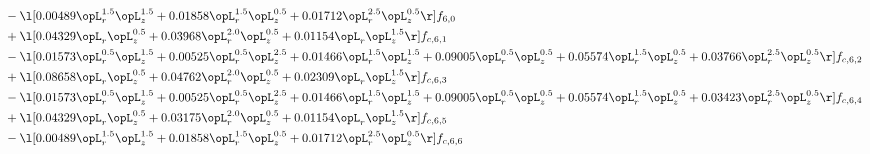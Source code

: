 \begin{alignat}{2}
& - \l[  0.00489 \opL_r^{1.5} \opL_z^{1.5} +  0.01858 \opL_r^{1.5} \opL_z^{0.5} +  0.01712 \opL_r^{2.5} \opL_z^{0.5}  \r] f_{6,0} \nonumber \\ 
& + \l[  0.04329 \opL_r \opL_z^{0.5} +  0.03968 \opL_r^{2.0} \opL_z^{0.5} +  0.01154 \opL_r \opL_z^{1.5}  \r] f_{c,6,1} \nonumber \\ 
& - \l[  0.01573 \opL_r^{0.5} \opL_z^{1.5} +  0.00525 \opL_r^{0.5} \opL_z^{2.5} +  0.01466 \opL_r^{1.5} \opL_z^{1.5} +  0.09005 \opL_r^{0.5} \opL_z^{0.5} +  0.05574 \opL_r^{1.5} \opL_z^{0.5} +  0.03766 \opL_r^{2.5} \opL_z^{0.5}  \r] f_{c,6,2} \nonumber \\ 
& + \l[  0.08658 \opL_r \opL_z^{0.5} +  0.04762 \opL_r^{2.0} \opL_z^{0.5} +  0.02309 \opL_r \opL_z^{1.5}  \r] f_{c,6,3} \nonumber \\ 
& - \l[  0.01573 \opL_r^{0.5} \opL_z^{1.5} +  0.00525 \opL_r^{0.5} \opL_z^{2.5} +  0.01466 \opL_r^{1.5} \opL_z^{1.5} +  0.09005 \opL_r^{0.5} \opL_z^{0.5} +  0.05574 \opL_r^{1.5} \opL_z^{0.5} +  0.03423 \opL_r^{2.5} \opL_z^{0.5}  \r] f_{c,6,4} \nonumber \\ 
& + \l[  0.04329 \opL_r \opL_z^{0.5} +  0.03175 \opL_r^{2.0} \opL_z^{0.5} +  0.01154 \opL_r \opL_z^{1.5}  \r] f_{c,6,5} \nonumber \\ 
& - \l[  0.00489 \opL_r^{1.5} \opL_z^{1.5} +  0.01858 \opL_r^{1.5} \opL_z^{0.5} +  0.01712 \opL_r^{2.5} \opL_z^{0.5}  \r] f_{c,6,6} \nonumber \\ 
\end{alignat} 


